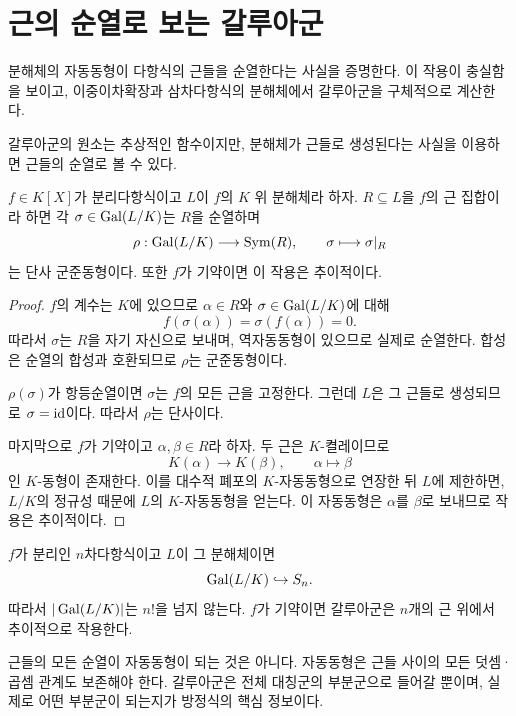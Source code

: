 \clearpage
\section{근의 순열로 보는 갈루아군}
\label{sec:galois-root-permutations}

\begin{learninggoal}
분해체의 자동동형이 다항식의 근들을 순열한다는 사실을 증명한다. 이 작용이 충실함을 보이고, 이중이차확장과 삼차다항식의 분해체에서 갈루아군을 구체적으로 계산한다.
\end{learninggoal}

갈루아군의 원소는 추상적인 함수이지만, 분해체가 근들로 생성된다는 사실을 이용하면 근들의 순열로 볼 수 있다.

\begin{theorem}
$f\in K[X]$가 분리다항식이고 $L$이 $f$의 $K$ 위 분해체라 하자. $R\subseteq L$을 $f$의 근 집합이라 하면 각 $\sigma\in\operatorname{Gal}(L/K)$는 $R$을 순열하며
\[
  \rho:\operatorname{Gal}(L/K)\longrightarrow\operatorname{Sym}(R),
  \qquad
  \sigma\longmapsto\sigma|_R
\]
는 단사 군준동형이다. 또한 $f$가 기약이면 이 작용은 추이적이다.
\end{theorem}

\begin{proof}
$f$의 계수는 $K$에 있으므로 $\alpha\in R$와 $\sigma\in\operatorname{Gal}(L/K)$에 대해
\[
  f(\sigma(\alpha))
  =\sigma(f(\alpha))=0.
\]
따라서 $\sigma$는 $R$을 자기 자신으로 보내며, 역자동동형이 있으므로 실제로 순열한다. 합성은 순열의 합성과 호환되므로 $\rho$는 군준동형이다.

$\rho(\sigma)$가 항등순열이면 $\sigma$는 $f$의 모든 근을 고정한다. 그런데 $L$은 그 근들로 생성되므로 $\sigma=\operatorname{id}$이다. 따라서 $\rho$는 단사이다.

마지막으로 $f$가 기약이고 $\alpha,\beta\in R$라 하자. 두 근은 $K$-켤레이므로
\[
  K(\alpha)\longrightarrow K(\beta),
  \qquad
  \alpha\longmapsto\beta
\]
인 $K$-동형이 존재한다. 이를 대수적 폐포의 $K$-자동동형으로 연장한 뒤 $L$에 제한하면, $L/K$의 정규성 때문에 $L$의 $K$-자동동형을 얻는다. 이 자동동형은 $\alpha$를 $\beta$로 보내므로 작용은 추이적이다.
\end{proof}

\begin{corollary}
$f$가 분리인 $n$차다항식이고 $L$이 그 분해체이면
\[
  \operatorname{Gal}(L/K)\hookrightarrow S_n.
\]
따라서 $|\operatorname{Gal}(L/K)|$는 $n!$을 넘지 않는다. $f$가 기약이면 갈루아군은 $n$개의 근 위에서 추이적으로 작용한다.
\end{corollary}

\begin{pitfall}
근들의 모든 순열이 자동동형이 되는 것은 아니다. 자동동형은 근들 사이의 모든 덧셈·곱셈 관계도 보존해야 한다. 갈루아군은 전체 대칭군의 부분군으로 들어갈 뿐이며, 실제로 어떤 부분군이 되는지가 방정식의 핵심 정보이다.
\end{pitfall}

